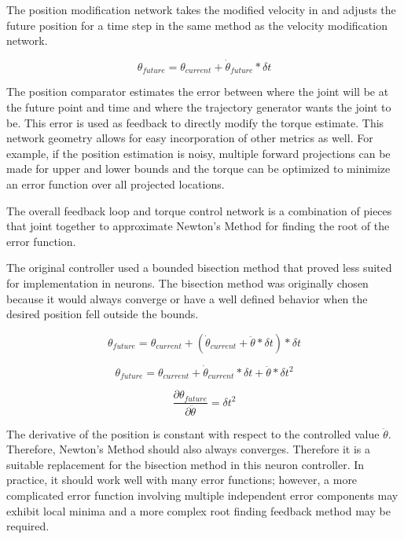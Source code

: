 
The position modification network takes the modified velocity in and adjusts the
future position for a time step in the same method as the velocity modification
network.

\begin{equation}
\theta_{future} = \theta_{current} + \dot{\theta}_{future} * \delta t
\end{equation}



The position comparator estimates the error between where the joint will be at
the future point and time and where the trajectory generator wants the joint
to be. This error is used as feedback to directly modify the torque estimate.
This network geometry allows for easy incorporation of other metrics as well.
For example, if the position estimation is noisy, multiple forward projections
can be made for upper and lower bounds and the torque can be optimized to 
minimize an error function over all projected locations.


The overall feedback loop and torque control network is a combination of pieces
that joint together to approximate
Newton's Method for finding the root of the error function.

The original 
controller used a bounded bisection method that proved less suited for 
implementation in neurons. The bisection method was originally chosen because
it would always converge or have a well defined behavior when the desired
position fell outside the bounds.

\begin{equation}
\theta_{future} = \theta_{current} + (\dot{\theta}_{current} + \ddot{\theta} * \delta t) * \delta t
\end{equation}

\begin{equation}
\theta_{future} = \theta_{current} + \dot{\theta}_{current} * \delta t + \ddot{\theta} * \delta t^{2}
\end{equation}

\begin{equation}
\dfrac{\partial \theta_{future}}{\partial \ddot{\theta}} = \delta t^{2}
\end{equation}

The derivative of the position is constant with respect to the controlled value
$\ddot{\theta}$. Therefore, Newton's Method should also always converges.
Therefore it is a suitable replacement for the bisection method in this neuron
controller. In practice, it should work well with many error functions; however,
a more complicated error function involving multiple independent error 
components may exhibit local minima and a more complex root finding feedback
method may be required.

